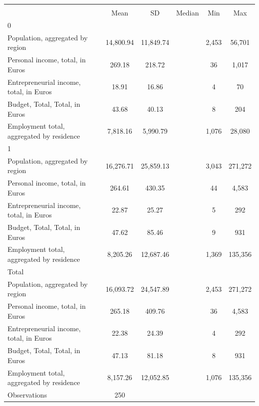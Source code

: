 {
\def\sym#1{\ifmmode^{#1}\else\(^{#1}\)\fi}
\begin{tabular}{l*{1}{ccccc}}
\toprule
                &\multicolumn{5}{c}{}                             \\
                &\multicolumn{1}{c}{{Mean}}&\multicolumn{1}{c}{{SD}}&\multicolumn{1}{c}{{Median}}&\multicolumn{1}{c}{{Min}}&\multicolumn{1}{c}{{Max}}\\
\midrule
0               &         &         &         &         &         \\
Population, aggregated by region&14,800.94&11,849.74&         &    2,453&   56,701\\
Personal income, total, in Euros&   269.18&   218.72&         &       36&    1,017\\
Entrepreneurial income, total, in Euros&    18.91&    16.86&         &        4&       70\\
Budget, Total, Total, in Euros&    43.68&    40.13&         &        8&      204\\
Employment total, aggregated by residence& 7,818.16& 5,990.79&         &    1,076&   28,080\\
\midrule
1               &         &         &         &         &         \\
Population, aggregated by region&16,276.71&25,859.13&         &    3,043&  271,272\\
Personal income, total, in Euros&   264.61&   430.35&         &       44&    4,583\\
Entrepreneurial income, total, in Euros&    22.87&    25.27&         &        5&      292\\
Budget, Total, Total, in Euros&    47.62&    85.46&         &        9&      931\\
Employment total, aggregated by residence& 8,205.26&12,687.46&         &    1,369&  135,356\\
\midrule
Total           &         &         &         &         &         \\
Population, aggregated by region&16,093.72&24,547.89&         &    2,453&  271,272\\
Personal income, total, in Euros&   265.18&   409.76&         &       36&    4,583\\
Entrepreneurial income, total, in Euros&    22.38&    24.39&         &        4&      292\\
Budget, Total, Total, in Euros&    47.13&    81.18&         &        8&      931\\
Employment total, aggregated by residence& 8,157.26&12,052.85&         &    1,076&  135,356\\
\midrule
Observations    &      250&         &         &         &         \\
\bottomrule
\end{tabular}
}
